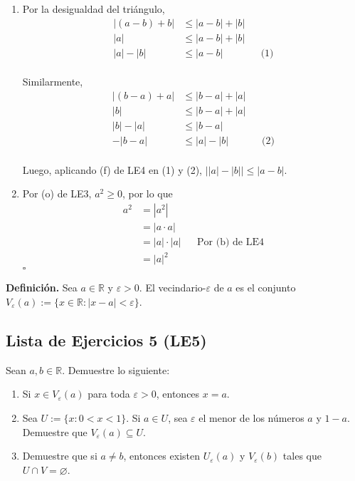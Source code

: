 \documentclass[11pt]{article}
\newcommand{\R}{\mathbb{R}}
\let\emptyset\varnothing
\begin{document}
\begin{enumerate}[label=\alph*),font=\bfseries]
    
    \item Por la desigualdad del triángulo,
        \begin{align*}
            |(a-b)+b| &\leq |a-b|+|b| \\
            |a| &\leq |a-b|+|b| \\
            |a|-|b| &\leq |a-b| && \text{(1)}
        \end{align*} \\
        Similarmente, 
        \begin{align*}
            |(b-a)+a| &\leq |b-a|+|a| \\
            |b| &\leq |b-a|+|a| \\
            |b|-|a| &\leq |b-a| \\
            -|b-a| &\leq |a|-|b| && \text{(2)}
        \end{align*} \\
        Luego, aplicando (f) de LE4 en (1) y (2), $\big| |a| - |b| \big| \leq |a-b|$.


    \item Por (o) de LE3, $a^2\geq 0$, por lo que \begin{align*}
        a^2 &= |a^2|\\
        &= |a\cdot a|\\
        &= |a| \cdot |a| && \text{Por (b) de LE4}\\
        &= |a|^2
    \end{align*} \mbox{}\hfill $\square$
\end{enumerate} 


\textbf{Definición.} Sea $a \in \R$ y $\varepsilon>0$. El vecindario-$\varepsilon$ de $a$ es el conjunto $V_\varepsilon(a):=\{ x\in \R: |x-a|<\varepsilon\}$.

\subsection*{Lista de Ejercicios 5 (LE5)}

Sean $a,b \in \R$. Demuestre lo siguiente:

\begin{enumerate}[label=\alph*)]
    \item Si $x\in V_\varepsilon(a)$ para toda $\varepsilon>0$, entonces $x=a$.
    \item Sea $U:=\{x: 0<x<1\}$. Si $a\in U$, sea $\varepsilon$ el menor de los números $a$ y $1-a$. Demuestre que $V_\varepsilon(a) \subseteq U$.
    \item Demuestre que si $a\neq b$, entonces existen $U_\varepsilon(a)$ y $V_\varepsilon(b)$ tales que $U\cap V =\emptyset$.
\end{enumerate}
\end{document}

